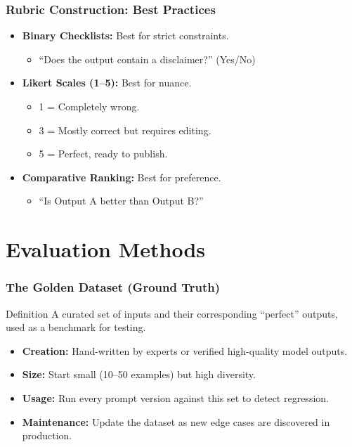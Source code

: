 \documentclass{beamer}
\begin{document}
\begin{frame}
    \frametitle{Rubric Construction: Best Practices}
    \begin{itemize}
        \item \textbf{Binary Checklists:} Best for strict constraints.
        \begin{itemize}
            \item ``Does the output contain a disclaimer?'' (Yes/No)
        \end{itemize}
        \item \textbf{Likert Scales (1--5):} Best for nuance.
        \begin{itemize}
            \item 1 = Completely wrong.
            \item 3 = Mostly correct but requires editing.
            \item 5 = Perfect, ready to publish.
        \end{itemize}
        \item \textbf{Comparative Ranking:} Best for preference.
        \begin{itemize}
            \item ``Is Output A better than Output B?''
        \end{itemize}
    \end{itemize}
\end{frame}

\section{Evaluation Methods}

\begin{frame}
    \frametitle{The Golden Dataset (Ground Truth)}
    \begin{block}{Definition}
        A curated set of inputs and their corresponding ``perfect'' outputs, used as a benchmark for testing.
    \end{block}
    \begin{itemize}
        \item \textbf{Creation:} Hand-written by experts or verified high-quality model outputs.
        \item \textbf{Size:} Start small (10--50 examples) but high diversity.
        \item \textbf{Usage:} Run every prompt version against this set to detect regression.
        \item \textbf{Maintenance:} Update the dataset as new edge cases are discovered in production.
    \end{itemize}
\end{frame}
\end{document}
